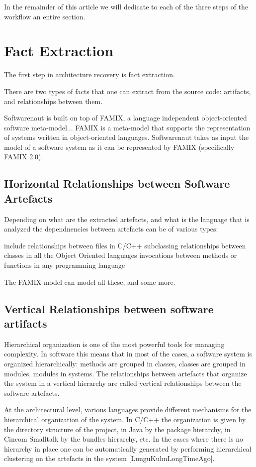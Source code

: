 \documentclass[preprint,12pt]{elsarticle}
\begin{document}
In the remainder of this article we will dedicate to each of the three steps of the workflow an entire section. 




\newpage
\section {Fact Extraction}
\label{sec:facts}

The first step in architecture recovery is fact extraction. 

There are two types of facts that one can extract from the source code: artifacts, and relationships between them. 

Softwarenaut is built on top of FAMIX, a language independent object-oriented software meta-model...
FAMIX is a meta-model that supports the representation of systems written in object-oriented languages. Softwarenaut takes as input the model of a software system as it can be represented by FAMIX (specifically FAMIX 2.0). 


\subsection {Horizontal Relationships between Software Artefacts}

Depending on what are the extracted artefacts, and what is the language that is analyzed the dependnencies between artefacts can be of various types:

include relationships between files in C/C++
subclassing relationships between classes in all the Object Oriented languages
invocations between methods or functions in any programming language

The FAMIX model can model all these, and some more.


\subsection {Vertical Relationships between software artifacts}

Hierarchical organization is one of the most powerful tools for managing complexity. In software this means that in most of the cases, a software system is organized hierarchically: methods are grouped in classes, classes are grouped in modules, modules in systems. The relationships between artefacts that organize the system in a vertical hierarchy are called vertical relationships between the software artefacts. 

At the architectural level, various languages provide different mechanisms for the hierarchical organization of the system. In C/C++ the organization is given by the directory structure of the project, in Java by the package hierarchy, in Cincom Smalltalk by the bundles hierarchy, etc. In the cases where there is no hierarchy in place one can be automatically generated by performing hierarchical clustering on the artefacts in the system [LunguKuhnLongTimeAgo]. 
\end{document}
